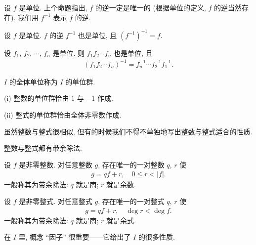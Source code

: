 \begin{definition}
    设 $f$ 是单位. 上个命题指出, $f$ 的逆一定是唯一的 (根据单位的定义, $f$ 的逆当然存在). 我们用 $f^{-1}$ 表示 $f$ 的逆.
\end{definition}

\begin{proposition}
    设 $f$ 是单位. $f$ 的逆 $f^{-1}$ 也是单位, 且 $(f^{-1})^{-1} = f$.
\end{proposition}

\begin{proposition}
    设 $f_1$, $f_2$, $\cdots$, $f_n$ 是单位. 则 $f_1 f_2 \cdots f_n$ 也是单位, 且
    \begin{align*}
        (f_1 f_2 \cdots f_n)^{-1} = f_n^{-1} \cdots f_2^{-1} f_1^{-1}.
    \end{align*}
\end{proposition}

\begin{definition}
    $I$ 的全体单位称为 $I$ 的单位群.
\end{definition}

\begin{proposition}
    (i) 整数的单位群恰由 $1$ 与 $-1$ 作成.

    (ii) 整式的单位群恰由全体非零数作成.
\end{proposition}

\begin{remark}
    虽然整数与整式很相似, 但有的时候我们不得不单独地写出整数与整式适合的性质.
\end{remark}

整数与整式都有带余除法.

\begin{proposition}
    设 $f$ 是非零整数. 对任意整数 $g$, 存在唯一的一对整数 $q$, $r$ 使
    \begin{align*}
        g = qf + r, \quad 0 \leq r < |f|.
    \end{align*}
    一般称其为带余除法: $q$ 就是商; $r$ 就是余数.
\end{proposition}

\begin{proposition}
    设 $f$ 是非零整式. 对任意整式 $g$, 存在唯一的一对整式 $q$, $r$ 使
    \begin{align*}
        g = q f + r, \quad \deg r < \deg f.
    \end{align*}
    一般称其为带余除法: $q$ 就是商; $r$ 就是余式.
\end{proposition}

在 $I$ 里, 概念 ``因子'' 很重要——它给出了 $I$ 的很多性质.

